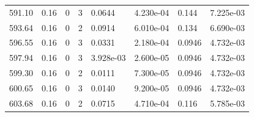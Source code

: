 \documentclass[preview]{standalone}
\begin{document}
{{{{{{{{{\begin{tabular}{L{1.2cm}C{1.2cm} C{0.3cm}C{0.5cm} C{1.4cm}C{1.4cm} C{1.4cm}C{1.4cm}}
  591.10  &  0.16  & 0     &  3 &  0.0644  & 4.230e-04  & 0.144 &  7.225e-03   \\ 
  593.64  &  0.16  & 0     &  2 &  0.0914  & 6.010e-04  & 0.134 &  6.690e-03   \\ 
  596.55  &  0.16  & 0     &  3 &  0.0331  & 2.180e-04  & 0.0946 &  4.732e-03   \\ 
  597.94  &  0.16  & 0     &  3 &  3.928e-03  & 2.600e-05  & 0.0946 &  4.732e-03   \\ 
  599.30  &  0.16  & 0     &  2 &  0.0111  & 7.300e-05  & 0.0946 &  4.732e-03   \\ 
  600.65  &  0.16  & 0     &  3 &  0.0140  & 9.200e-05  & 0.0946 &  4.732e-03   \\ 
  603.68  &  0.16  & 0     &  2 &  0.0715  & 4.710e-04  & 0.116 &  5.785e-03   \\ 
\hline 
\end{tabular} 

}}}}}}}}}
\end{document}
